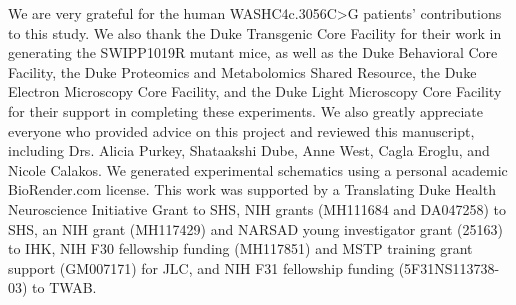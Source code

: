 
We are very grateful for the human WASHC4c.3056C>G patients’ contributions to
this study. We also thank the Duke Transgenic Core Facility for their work in
generating the SWIPP1019R mutant mice, as well as the Duke Behavioral Core
Facility, the Duke Proteomics and Metabolomics Shared Resource, the Duke
Electron Microscopy Core Facility, and the Duke Light Microscopy Core Facility
for their support in completing these experiments. We also greatly appreciate
everyone who provided advice on this project and reviewed this manuscript,
including Drs. Alicia Purkey, Shataakshi Dube, Anne West, Cagla Eroglu, and
Nicole Calakos. We generated experimental schematics using a personal academic
BioRender.com license. This work was supported by a Translating Duke Health
Neuroscience Initiative Grant to SHS, NIH grants (MH111684 and DA047258) to SHS,
an NIH grant (MH117429) and NARSAD young investigator grant (25163) to IHK, NIH
F30 fellowship funding (MH117851) and MSTP training grant support (GM007171) for
JLC, and NIH F31 fellowship funding (5F31NS113738-03) to TWAB.
